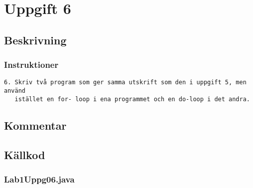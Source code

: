 \section{Uppgift 6}\label{uppgift-6}

\subsection{Beskrivning}
\subsubsection*{Instruktioner}
\begin{verbatim}
6. Skriv två program som ger samma utskrift som den i uppgift 5, men använd
   istället en for- loop i ena programmet och en do-loop i det andra.
\end{verbatim}

\subsection{Kommentar}

\subsection{Källkod}\label{uppgift-6_src}
\subsubsection*{Lab1Uppg06.java}
\inputminted[]{java}{src/Lab1Uppg06.java}
